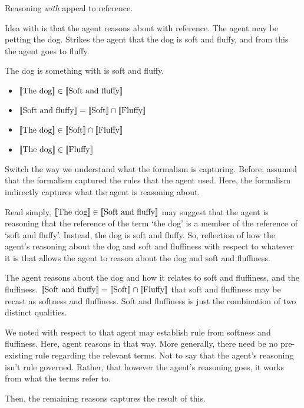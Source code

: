 \begin{note}[Example, \ur{}]
  Reasoning \emph{with} appeal to reference.

  Idea with \ur{} is that the agent reasons about with reference.
  The agent may be petting the dog.
  Strikes the agent that the dog is soft and fluffy, and from this the agent goes to fluffy.

  The dog is something with is soft and fluffy.
  \begin{itemize}
  \item \([\![ \text{The dog} ]\!] \in [\![ \text{Soft and fluffy} ]\!]\)
  \item \([\![ \text{Soft and fluffy} ]\!] = [\![ \text{Soft} ]\!] \cap [\![ \text{Fluffy} ]\!]\)
  \item \([\![ \text{The dog} ]\!] \in [\![ \text{Soft} ]\!] \cap [\![ \text{Fluffy} ]\!]\)
  \item \([\![ \text{The dog} ]\!] \in [\![ \text{Fluffy} ]\!]\)
  \end{itemize}

  Switch the way we understand what the formalism is capturing.
  Before, assumed that the formalism captured the rules that the agent used.
  Here, the formalism indirectly captures what the agent is reasoning about.

  Read simply, \([\![ \text{The dog} ]\!] \in [\![ \text{Soft and fluffy} ]\!]\) may suggest that the agent is reasoning that the reference of the term `the dog' is a member of the reference of `soft and fluffy'.
  Instead, the dog is soft and fluffy.
  So, reflection of how the agent's reasoning about the dog and soft and fluffiness with respect to whatever it is that allows the agent to reason about the dog and soft and fluffiness.

  The agent reasons about the dog and how it relates to soft and fluffiness, and the fluffiness.
  \([\![ \text{Soft and fluffy} ]\!] = [\![ \text{Soft} ]\!] \cap [\![ \text{Fluffy} ]\!]\) that soft and fluffiness may be recast as softness and fluffiness.
  Soft and fluffiness is just the combination of two distinct qualities.

  We noted with respect to \nr{} that agent may establish rule from softness and fluffiness.
  Here, agent reasons in that way.
  More generally, there need be no pre-existing rule regarding the relevant terms.
  Not to say that the agent's reasoning isn't rule governed.
  Rather, that however the agent's reasoning goes, it works from what the terms refer to.

  Then, the remaining reasons captures the result of this.
\end{note}

